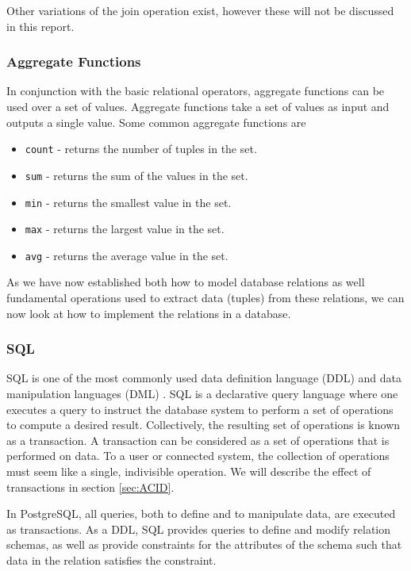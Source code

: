 Other variations of the join operation exist\cite{DBSBook}, however these will not be discussed in this report.\\
\subsubsection*{Aggregate Functions}
In conjunction with the basic relational operators, aggregate functions can be used over a set of values.
Aggregate functions take a set of values as input and outputs a single value\cite{DBSBook}. Some common aggregate functions are 
\begin{itemize} \label{aggregateFunctions}
    \item \texttt{count} - returns the number of tuples in the set.
    \item \texttt{sum} - returns the sum of the values in the set.
    \item \texttt{min} - returns the smallest value in the set.
    \item \texttt{max} - returns the largest value in the set.
    \item \texttt{avg} - returns the average value in the set.
\end{itemize}


As we have now established both how to model database relations as well fundamental operations used to extract data (tuples) from these relations, we can now look at how to implement the relations in a database.

\subsubsection{SQL}\label{sec:SQL}
SQL is one of the most commonly used data definition language (DDL) and data manipulation languages (DML) \cite{DBSBook}.
SQL is a declarative query language where one executes a query to instruct the database system to perform a set of operations to compute a desired result.
Collectively, the resulting set of operations is known as a transaction.
A transaction can be considered as a set of operations that is performed on data.
To a user or connected system, the collection of operations must seem like a single, indivisible operation\cite{DBSBook}.
We will describe the effect of transactions in section \ref{sec:ACID}.


In PostgreSQL, all queries, both to define and to manipulate data, are executed as transactions\cite{postgres_transactions}.
As a DDL, SQL provides queries to define and modify relation schemas, as well as provide constraints for the attributes of the schema such that data in the relation satisfies the constraint.  

